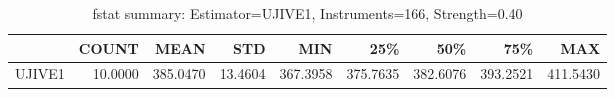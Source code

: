 \begin{table}[ht]
\centering
\caption{fstat summary: Estimator=UJIVE1, Instruments=166, Strength=0.40}
\begin{tabular}{lrrrrrrrr}
\toprule
 & COUNT & MEAN & STD & MIN & 25\% & 50\% & 75\% & MAX \\
\midrule
UJIVE1 & 10.0000 & 385.0470 & 13.4604 & 367.3958 & 375.7635 & 382.6076 & 393.2521 & 411.5430 \\
\bottomrule
\end{tabular}
\end{table}
